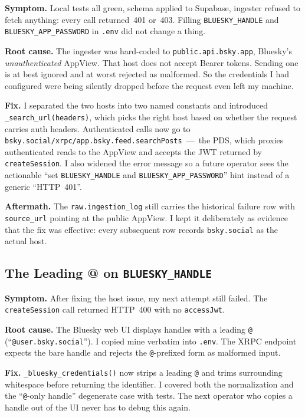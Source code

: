 \documentclass[11pt]{article}
\begin{document}
\textbf{Symptom.} Local tests all green, schema applied to Supabase,
ingester refused to fetch anything: every call returned~401 or~403.
Filling \texttt{BLUESKY\_HANDLE} and \texttt{BLUESKY\_APP\_PASSWORD} in
\texttt{.env} did not change a thing.

\textbf{Root cause.} The ingester was hard-coded to
\texttt{public.api.bsky.app}, Bluesky's \emph{unauthenticated} AppView.
That host does not accept Bearer tokens. Sending one is at best
ignored and at worst rejected as malformed. So the credentials I had
configured were being silently dropped before the request even left my
machine.

\textbf{Fix.} I separated the two hosts into two named constants and
introduced \texttt{\_search\_url(headers)}, which picks the right host
based on whether the request carries auth headers. Authenticated calls
now go to \texttt{bsky.social/xrpc/app.bsky.feed.searchPosts}~---~the
PDS, which proxies authenticated reads to the AppView and accepts the
JWT returned by \texttt{createSession}. I also widened the error
message so a future operator sees the actionable
``set \texttt{BLUESKY\_HANDLE} and \texttt{BLUESKY\_APP\_PASSWORD}''
hint instead of a generic ``HTTP~401''.

\textbf{Aftermath.} The \texttt{raw.ingestion\_log} still carries the
historical failure row with \texttt{source\_url} pointing at the public
AppView. I kept it deliberately as evidence that the fix was effective:
every subsequent row records \texttt{bsky.social} as the actual host.

\subsection{The Leading @ on \texttt{BLUESKY\_HANDLE}}

\textbf{Symptom.} After fixing the host issue, my next attempt still
failed. The \texttt{createSession} call returned HTTP~400 with no
\texttt{accessJwt}.

\textbf{Root cause.} The Bluesky web UI displays handles with a leading
\texttt{@} (``\texttt{@user.bsky.social}''). I copied mine verbatim into
\texttt{.env}. The XRPC endpoint expects the bare handle and rejects
the \texttt{@}-prefixed form as malformed input.

\textbf{Fix.} \texttt{\_bluesky\_credentials()} now strips a leading
\texttt{@} and trims surrounding whitespace before returning the
identifier. I covered both the normalization and the
``\texttt{@}-only handle'' degenerate case with tests. The next operator
who copies a handle out of the UI never has to debug this again.
\end{document}
